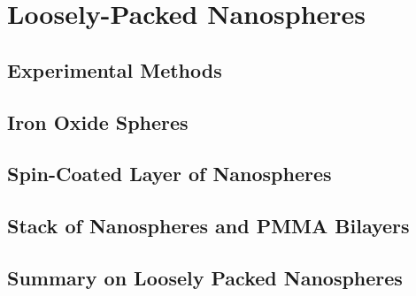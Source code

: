 \documentclass[\main/dresen_thesis.tex]{subfiles}
\renewcommand{\thisPath}{\main/chapters/looselyPackedNS}
\begin{document}
  \chapter{Loosely-Packed Nanospheres}\label{ch:looselyPackedNS}
    
      \FloatBarrier
      \clearpage

    \section{Experimental Methods}
      
        \FloatBarrier
        \clearpage

    \section{Iron Oxide Spheres}\label{sec:looselyPackedNP:sphericalIronOxideNP}
      
        \FloatBarrier
        \clearpage

    \section{Spin-Coated Layer of Nanospheres}
      
      \FloatBarrier
        \clearpage

    \section{Stack of Nanospheres and PMMA Bilayers}
      
      \FloatBarrier
        \clearpage

    \section{Summary on Loosely Packed Nanospheres}
      
      \FloatBarrier
\end{document}
